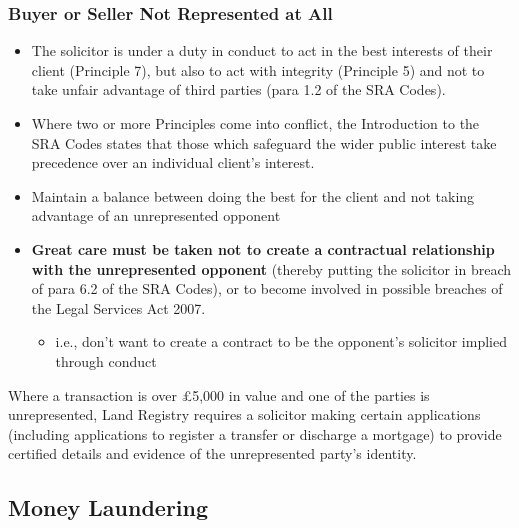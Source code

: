 \documentclass[
]{article}
\newenvironment{Shaded}{}{}
\newcommand{\NormalTok}[1]{#1}
\providecommand{\tightlist}{%
  \setlength{\itemsep}{0pt}\setlength{\parskip}{0pt}}
\begin{document}
\hypertarget{buyer-or-seller-not-represented-at-all}{%
\subsubsection{Buyer or Seller Not Represented at
All}\label{buyer-or-seller-not-represented-at-all}}

\begin{itemize}
\tightlist
\item
  The solicitor is under a duty in conduct to act in the best interests
  of their client (Principle 7), but also to act with integrity
  (Principle 5) and not to take unfair advantage of third parties (para
  1.2 of the SRA Codes).
\item
  Where two or more Principles come into conflict, the Introduction to
  the SRA Codes states that those which safeguard the wider public
  interest take precedence over an individual client's interest.
\item
  Maintain a balance between doing the best for the client and not
  taking advantage of an unrepresented opponent
\item
  \textbf{Great care must be taken not to create a contractual
  relationship with the unrepresented opponent} (thereby putting the
  solicitor in breach of para 6.2 of the SRA Codes), or to become
  involved in possible breaches of the Legal Services Act 2007.

  \begin{itemize}
  \tightlist
  \item
    i.e., don't want to create a contract to be the opponent's solicitor
    implied through conduct
  \end{itemize}
\end{itemize}

\begin{Shaded}
\begin{Highlighting}[]
\NormalTok{Where a transaction is over £5,000 in value and one of the parties is unrepresented, Land Registry requires a solicitor making certain applications (including applications to register a transfer or discharge a mortgage) to provide certified details and evidence of the unrepresented party’s identity.}
\end{Highlighting}
\end{Shaded}

\hypertarget{money-laundering}{%
\subsection{Money Laundering}\label{money-laundering}}
\end{document}
